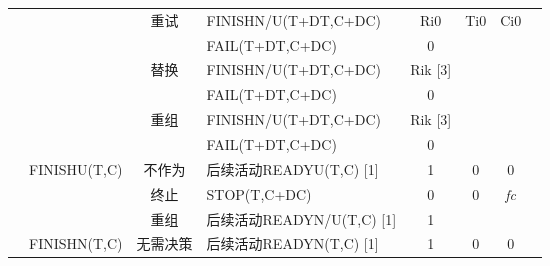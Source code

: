 \begin{table}[htbp]
\begin{tabular}{rrrrrrrr}
        \multicolumn{1}{c}{} 
        &       
        & \multicolumn{1}{c}{\multirow{2}[4]{*}{重试}} & \multicolumn{1}{l}{FINISHN/U(T+DT,C+DC)} & \multicolumn{1}{c}{Ri0} & \multicolumn{1}{c}{\multirow{2}[4]{*}{Ti0}} & \multicolumn{1}{c}{\multirow{2}[4]{*}{Ci0}} \\
        \multicolumn{1}{c}{} &       & \multicolumn{1}{c}{} & \multicolumn{1}{l}{FAIL(T+DT,C+DC)} & \multicolumn{1}{c}{0} & \multicolumn{1}{c}{} & \multicolumn{1}{c}{} \\
        \multicolumn{1}{c}{} &       & \multicolumn{1}{c}{\multirow{2}[4]{*}{替换}} & \multicolumn{1}{l}{FINISHN/U(T+DT,C+DC)} & \multicolumn{1}{c}{Rik  [3]} & \multicolumn{1}{c}{\multirow{2}[4]{*}{\textit{}}} & \multicolumn{1}{c}{\multirow{2}[4]{*}{\textit{}}} \\
        \multicolumn{1}{c}{} &       & \multicolumn{1}{c}{} & \multicolumn{1}{l}{FAIL(T+DT,C+DC)} & \multicolumn{1}{c}{0} & \multicolumn{1}{c}{} & \multicolumn{1}{c}{} \\
        \multicolumn{1}{c}{} &       & \multicolumn{1}{c}{\multirow{2}[4]{*}{重组}} & \multicolumn{1}{l}{FINISHN/U(T+DT,C+DC)} & \multicolumn{1}{c}{Rik  [3]} & \multirow{2}[4]{*}{\textit{}} & \multirow{2}[4]{*}{\textit{}} \\
        \multicolumn{1}{c}{} &       & \multicolumn{1}{c}{} & \multicolumn{1}{l}{FAIL(T+DT,C+DC)} & \multicolumn{1}{c}{0} &       &  \\
        \multicolumn{1}{c}{} & \multirow{3}[6]{*}{FINISHU(T,C)} & \multicolumn{1}{c}{不作为} & \multicolumn{1}{l}{后续活动READYU(T,C) [1]} & \multicolumn{1}{c}{1} & \multicolumn{1}{c}{0} & \multicolumn{1}{c}{0} \\
        \multicolumn{1}{c}{} &       & \multicolumn{1}{c}{终止} & \multicolumn{1}{l}{STOP(T,C+DC)} & \multicolumn{1}{c}{0} & \multicolumn{1}{c}{0} & \multicolumn{1}{c}{\textit{fc}} \\
        \multicolumn{1}{c}{} &       & \multicolumn{1}{c}{重组} & \multicolumn{1}{l}{后续活动READYN/U(T,C) [1]} & \multicolumn{1}{c}{1} &       & \textit{} \\
        \multicolumn{1}{c}{} & FINISHN(T,C) & \multicolumn{1}{c}{无需决策} & \multicolumn{1}{l}{后续活动READYN(T,C) [1]} & \multicolumn{1}{c}{1} & \multicolumn{1}{c}{0} & \multicolumn{1}{c}{0} \\
            \bottomrule
        \end{tabular}%
        \label{tab:addlabel}%
    \end{table}%
    

